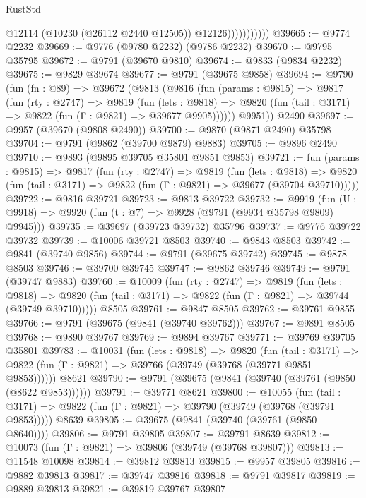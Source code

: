 \begin{lexlean}{RustStd}
\begin{coremodule}
                          @12114
                          (@10230 (@26112 @2440 @12505))
                          @12126)))))))))))
@39665 := @9774 @2232
@39669 := @9776 (@9780 @2232) (@9786 @2232)
@39670 := @9795 @35795
@39672 := @9791 (@39670 @9810)
@39674 := @9833 (@9834 @2232)
@39675 := @9829 @39674
@39677 := @9791 (@39675 @9858)
@39694 := @9790
    (fun (fn : @89) =>
    @39672
      (@9813
        (@9816
          (fun (params : @9815) =>
          @9817
            (fun (rty : @2747) =>
            @9819
              (fun (lets : @9818) =>
              @9820 (fun (tail : @3171) => @9822 (fun (Γ : @9821) => @39677 @9905))))))
        @9951))
    @2490
@39697 := @9957 (@39670 (@9808 @2490))
@39700 := @9870 (@9871 @2490) @35798
@39704 := @9791 (@9862 (@39700 @9879) @9883)
@39705 := @9896 @2490
@39710 := @9893 (@9895 @39705 @35801 @9851 @9853)
@39721 := fun (params : @9815) =>
  @9817
    (fun (rty : @2747) =>
    @9819
      (fun (lets : @9818) =>
      @9820 (fun (tail : @3171) => @9822 (fun (Γ : @9821) => @39677 (@39704 @39710)))))
@39722 := @9816 @39721
@39723 := @9813 @39722
@39732 := @9919
    (fun (U : @9918) => @9920 (fun (t : @7) => @9928 (@9791 (@9934 @35798 @9809) @9945)))
@39735 := @39697 (@39723 @39732) @35796
@39737 := @9776 @39722 @39732
@39739 := @10006 @39721 @8503
@39740 := @9843 @8503
@39742 := @9841 (@39740 @9856)
@39744 := @9791 (@39675 @39742)
@39745 := @9878 @8503
@39746 := @39700 @39745
@39747 := @9862 @39746
@39749 := @9791 (@39747 @9883)
@39760 := @10009
    (fun (rty : @2747) =>
    @9819
      (fun (lets : @9818) =>
      @9820 (fun (tail : @3171) => @9822 (fun (Γ : @9821) => @39744 (@39749 @39710)))))
    @8505
@39761 := @9847 @8505
@39762 := @39761 @9855
@39766 := @9791 (@39675 (@9841 (@39740 @39762)))
@39767 := @9891 @8505
@39768 := @9890 @39767
@39769 := @9894 @39767
@39771 := @39769 @39705 @35801
@39783 := @10031
    (fun (lets : @9818) =>
    @9820
      (fun (tail : @3171) =>
      @9822 (fun (Γ : @9821) => @39766 (@39749 (@39768 (@39771 @9851 @9853))))))
    @8621
@39790 := @9791 (@39675 (@9841 (@39740 (@39761 (@9850 (@8622 @9853))))))
@39791 := @39771 @8621
@39800 := @10055
    (fun (tail : @3171) => @9822 (fun (Γ : @9821) => @39790 (@39749 (@39768 (@39791 @9853)))))
    @8639
@39805 := @39675 (@9841 (@39740 (@39761 (@9850 @8640))))
@39806 := @9791 @39805
@39807 := @39791 @8639
@39812 := @10073 (fun (Γ : @9821) => @39806 (@39749 (@39768 @39807)))
@39813 := @11548 @10098
@39814 := @39812 @39813
@39815 := @9957 @39805
@39816 := @9882 @39813
@39817 := @39747 @39816
@39818 := @9791 @39817
@39819 := @9889 @39813
@39821 := @39819 @39767 @39807

\end{coremodule}
\end{lexlean}
